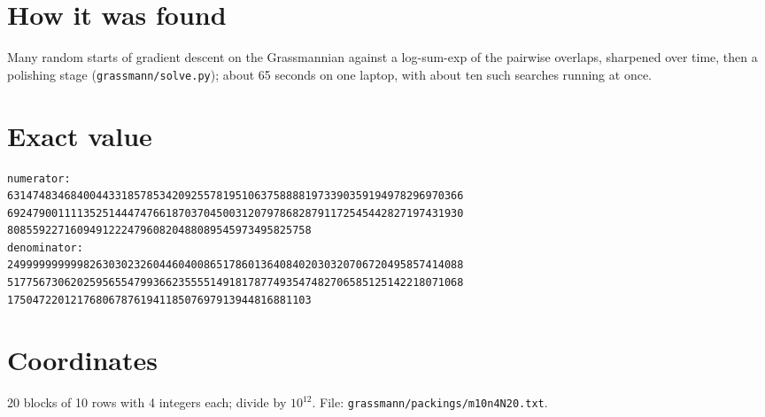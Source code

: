 \documentclass[11pt,a4paper]{article}
\begin{document}
\section{How it was found}
Many random starts of gradient descent on the Grassmannian against a log-sum-exp of the pairwise overlaps, sharpened over time, then a polishing stage (\texttt{grassmann/solve.py}); about 65 seconds on one laptop, with about ten such searches running at once.


\appendix
\section{Exact value}
{\small
\begin{verbatim}
numerator:
631474834684004433185785342092557819510637588881973390359194978296970366
692479001111352514447476618703704500312079786828791172545442827197431930
808559227160949122247960820488089545973495825758
denominator:
249999999999826303023260446040086517860136408402030320706720495857414088
517756730620259565547993662355551491817877493547482706585125142218071068
175047220121768067876194118507697913944816881103
\end{verbatim}}

\section{Coordinates}
20 blocks of 10 rows with 4 integers each; divide by $10^{12}$. File: \texttt{grassmann/packings/m10n4N20.txt}.
{\tiny
\begin{multicols}{3}
\end{multicols}}
\end{document}
